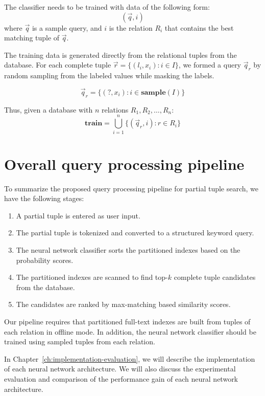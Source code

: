 The classifier needs to be trained with data of the following form:
$$
(\vec q, i)
$$
where $\vec q$ is a sample query, and $i$ is the relation $R_i$ that contains the best matching
tuple of $\vec q$.

The training data is generated directly from the relational tuples from the database.  For each complete tuple $\vec r = \{(l_i, x_i): i\in I\}$, we formed a query $\vec q_r$ by random sampling from
the labeled values while masking the labels.

$$
\vec q_r = \{(?, x_i): i\in\mathbf{sample}(I)\}
$$

Thus, given a database with $n$ relations $R_1, R_2, \dots, R_n$:
$$
\mathbf{train} = \bigcup_{i=1}^n\{(\vec q_r, i): r\in R_i\}
$$

\section{Overall query processing pipeline}

To summarize the proposed query processing pipeline for partial tuple search, we have the following stages:

\begin{enumerate}
    \item A partial tuple is entered as user input.
    \item The partial tuple is tokenized and converted to a structured keyword query.
    \item The neural network classifier sorts the partitioned indexes based on the probability scores.
    \item The partitioned indexes are scanned to find top-$k$ complete tuple candidates from the database.
    \item The candidates are ranked by max-matching based similarity scores.
\end{enumerate}

Our pipeline requires that partitioned full-text indexes are built from tuples of each relation in offline mode. In addition, the neural network classifier should be trained using sampled tuples from each relation.

In Chapter~\ref{ch:implementation-evaluation}, we will describe the implementation of each neural network architecture. We will also discuss the experimental evaluation and comparison of the performance gain of each neural network architecture.